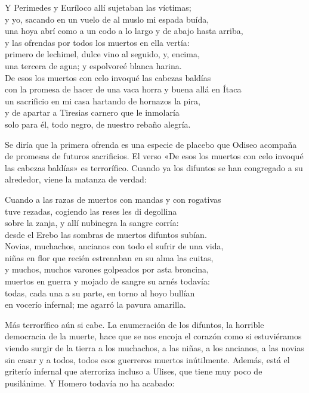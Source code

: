 \begin{versocita}
Y Perimedes y Euríloco allí sujetaban las víctimas;\\
y yo, sacando en un vuelo de al muslo mi espada buída,\\
una hoya abrí como a un codo a lo largo y de abajo hasta arriba,\\
y las ofrendas por todos los muertos en ella vertía:\\
primero de lechimel, dulce vino al seguido, y, encima,\\
una tercera de agua; y espolvoreé blanca harina.\\
De esos los muertos con celo invoqué las cabezas baldías\\
con la promesa de hacer de una vaca horra y buena allá en Ítaca\\
un sacrificio en mi casa hartando de hornazos la pira,\\
y de apartar a Tiresias carnero que le inmolaría\\
solo para él, todo negro, de nuestro rebaño alegría.
\end{versocita}

Se diría que la primera ofrenda es una especie de placebo que Odiseo acompaña de promesas de futuros sacrificios. El verso «De esos los muertos con celo invoqué las cabezas baldías» es terrorífico. Cuando ya los difuntos se han congregado a su alrededor, viene la matanza de verdad:

\begin{versocita}
Cuando a las razas de muertos con mandas y con rogativas\\
tuve rezadas, cogiendo las reses les di degollina\\
sobre la zanja, y allí nubinegra la sangre corría:\\
desde el Erebo las sombras de muertos difuntos subían.\\
Novias, muchachos, ancianos con todo el sufrir de una vida,\\
niñas en flor que recién estrenaban en su alma las cuitas,\\
y muchos, muchos varones golpeados por asta broncina,\\
muertos en guerra y mojado de sangre su arnés todavía:\\
todas, cada una a su parte, en torno al hoyo bullían\\
en vocerío infernal; me agarró la pavura amarilla.
\end{versocita}

Más terrorífico aún si cabe. La enumeración de los difuntos, la horrible democracia de la muerte, hace que se nos encoja el corazón como si estuviéramos viendo surgir de la tierra a los muchachos, a las niñas, a los ancianos, a las novias sin casar y a todos, todos esos guerreros muertos inútilmente. Además, está el griterío infernal que aterroriza incluso a Ulises, que tiene muy poco de pusilánime. Y Homero todavía no ha acabado:

